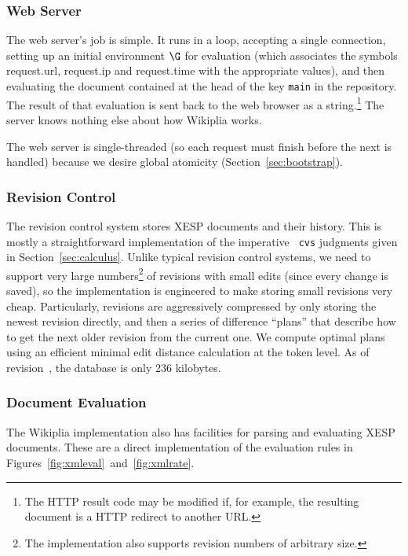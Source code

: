 \documentclass[twocolumn]{article}
\begin{document}
\subsubsection{Web Server}

The web server's job is simple. It runs in a loop, accepting a single
connection, setting up an initial environment $\G$ for evaluation
(which associates the symbols {\sf request.url}, {\sf request.ip} and
{\sf request.time} with the appropriate values), and then evaluating
the document contained at the head of the key {\tt main} in the
repository. The result of that evaluation is sent back to the web
browser as a string.\z\footnote{The HTTP result code may be modified
if, for example, the resulting document is a HTTP redirect to another
URL.} The server knows nothing else about how Wikiplia works.

The web server is single-threaded (so each request must finish
before the next is handled) because we desire global atomicity
(Section~\ref{sec:bootstrap}).

\subsubsection{Revision Control}

The revision control system stores XESP documents and their history.
This is mostly a straightforward implementation of the imperative {\tt
cvs} judgments given in Section~\ref{sec:calculus}. Unlike typical
revision control systems, we need to support very large
numbers\footnote{The implementation also supports revision numbers of
arbitrary size.} of revisions with small edits (since every change is
saved), so the implementation is engineered to make storing small
revisions very cheap. Particularly, revisions are aggressively
compressed by only storing the newest revision directly, and then a
series of difference ``plans'' that describe how to get the next older
revision from the current one. We compute optimal plans using an
efficient minimal edit distance
calculation at the token level. As of
revision~\currentrevision, the database is only 236
kilobytes.\z{}

\subsubsection{Document Evaluation}

The Wikiplia implementation also has facilities for parsing and
evaluating XESP documents. These are a direct implementation of the
evaluation rules in Figures~\ref{fig:xmleval}~and~\ref{fig:xmlrate}.
\end{document}
